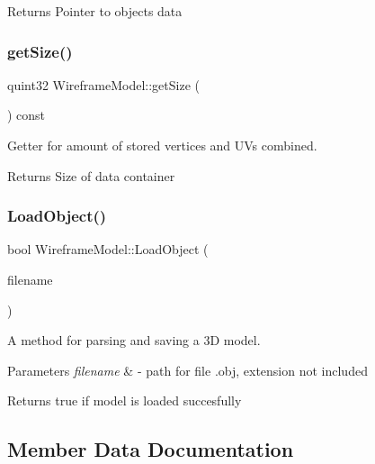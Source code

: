 \begin{DoxyReturn}{Returns}
Pointer to object\textquotesingle{}s data 
\end{DoxyReturn}
\mbox{\label{class_wireframe_model_a5fc0323e4618b80e1b2b227f2470b6a0}} 
\subsubsection{get\+Size()}
{\footnotesize\ttfamily quint32 Wireframe\+Model\+::get\+Size (\begin{DoxyParamCaption}{ }\end{DoxyParamCaption}) const}



Getter for amount of stored vertices and UV\textquotesingle{}s combined. 

\begin{DoxyReturn}{Returns}
Size of data container 
\end{DoxyReturn}
\mbox{\label{class_wireframe_model_ac5f8817ea433184dda70ee25633043ae}} 
\subsubsection{Load\+Object()}
{\footnotesize\ttfamily bool Wireframe\+Model\+::\+Load\+Object (\begin{DoxyParamCaption}\item[{const Q\+String}]{filename }\end{DoxyParamCaption})}



A method for parsing and saving a 3D model. 


\begin{DoxyParams}{Parameters}
{\em filename} & -\/ path for file .obj, extension not included \\
\hline
\end{DoxyParams}
\begin{DoxyReturn}{Returns}
true if model is loaded succesfully 
\end{DoxyReturn}


\subsection{Member Data Documentation}
\mbox{\label{class_wireframe_model_a9fb28b2dedbdcfff31c9ccc592b8492a}} 

